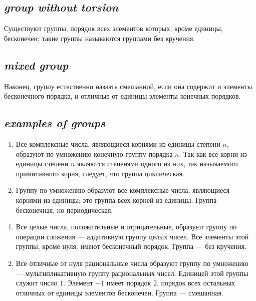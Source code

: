 \subsection*{ \textit{group without torsion}}
\begin{rusblock}
Существуют группы, порядок всех элементов которых, кроме единицы, бесконечен; такие группы называются группами без кручения.
\end{rusblock}

\subsection*{ \textit{mixed group}}
\begin{rusblock}
Наконец, группу естественно назвать смешанной, если она содержит и элементы бесконечного порядка, и отличные от единицы элементы конечных порядков.
\end{rusblock}

\subsection*{ \textit{examples of groups}}
\begin{rusblock}
\begin{enumerate}[leftmargin=2.2em]
\item Все комплексные числа, являющиеся корнями из единицы степени $n$, образуют по умножению конечную группу порядка $n$. Так как все корни из единицы степени $n$ являются степенями одного из них, так называемого примитивного корня, следует, что группа циклическая.
\item Группу по умножению образуют все комплексные числа, являющиеся корнями из единицы; это группа всех корней из единицы. Группа бесконечная, но периодическая.
\end{enumerate}
\end{rusblock}


\begin{rusblock}
\begin{enumerate}[leftmargin=2.2em,start=3]
\item Все целые числа, положительные и отрицательные, образуют группу по операции сложения --- аддитивную группу целых чисел. Все элементы этой группы, кроме нуля, имеют бесконечный порядок. Группа --- без кручения.
\item Все отличные от нуля рациональные числа образуют группу по умножению --- мультипликативную группу рациональных чисел. Единицей этой группы служит число $1$. Элемент $-1$ имеет порядок $2$, порядок всех остальных отличных от единицы элементов бесконечен. Группа --- смешанная.
\end{enumerate}
\end{rusblock}


